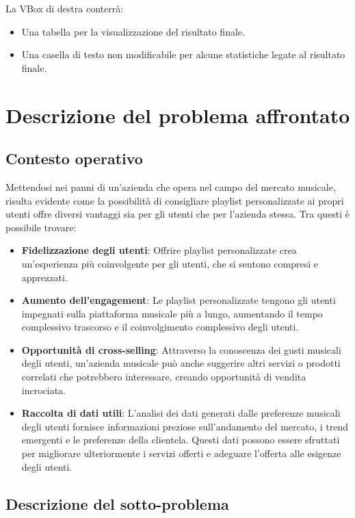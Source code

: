 \documentclass[12pt, a4paper]{article}
\begin{document}
La VBox di destra conterrà:
\begin{itemize}
\item Una tabella per la visualizzazione del risultato finale.
\item Una casella di testo non modificabile per alcune statistiche legate al risultato finale.
\end{itemize}

\newpage
\section{Descrizione del problema affrontato}

\subsection{Contesto operativo}

Mettendosi nei panni di un'azienda che opera nel campo del mercato  musicale, risulta evidente come la possibilità di consigliare playlist personalizzate ai propri utenti offre diversi vantaggi sia per gli utenti che per l'azienda stessa. Tra questi è possibile trovare:
\begin{itemize}
\item \textbf{Fidelizzazione degli utenti}: Offrire playlist personalizzate crea un'esperienza più coinvolgente per gli utenti, che si sentono compresi e apprezzati.
\item \textbf{Aumento dell'engagement}: Le playlist personalizzate tengono gli utenti impegnati sulla piattaforma musicale più a lungo, aumentando il tempo complessivo trascorso e il coinvolgimento complessivo degli utenti.
\item \textbf{Opportunità di cross-selling}: Attraverso la conoscenza dei gusti musicali degli utenti, un'azienda musicale può anche suggerire altri servizi o prodotti correlati che potrebbero interessare, creando opportunità di vendita incrociata.
\item \textbf{Raccolta di dati utili}: L'analisi dei dati generati dalle preferenze musicali degli utenti fornisce informazioni preziose sull'andamento del mercato, i trend emergenti e le preferenze della clientela. Questi dati possono essere sfruttati per migliorare ulteriormente i servizi offerti e adeguare l'offerta alle esigenze degli utenti.
\end{itemize}

\subsection{Descrizione del sotto-problema}
\end{document}
